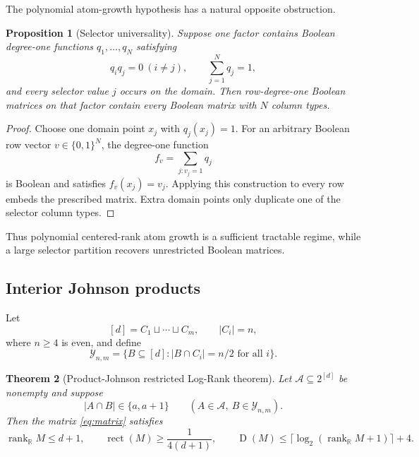 \documentclass[11pt]{article}
\newtheorem{theorem}{Theorem}[section]
\newtheorem{proposition}[theorem]{Proposition}
\theoremstyle{definition}
\theoremstyle{remark}
\newcommand{\cA}{\mathcal A}
\newcommand{\cY}{\mathcal Y}
\newcommand{\R}{\mathbb R}
\newcommand{\1}{\mathbf 1}
\newcommand{\rank}{\operatorname{rank}}
\newcommand{\rect}{\operatorname{rect}}
\newcommand{\Dcc}{\operatorname{D}}
\begin{document}
The polynomial atom-growth hypothesis has a natural opposite obstruction.

\begin{proposition}[Selector universality]\label{prop:selector}
Suppose one factor contains Boolean degree-one functions
$q_1,\ldots,q_N$ satisfying
\[
 q_iq_j=0\ (i\ne j),
 \qquad
 \sum_{j=1}^Nq_j=1,
\]
and every selector value $j$ occurs on the domain.  Then row-degree-one
Boolean matrices on that factor contain every Boolean matrix with $N$
column types.
\end{proposition}

\begin{proof}
Choose one domain point $x_j$ with $q_j(x_j)=1$.  For an arbitrary Boolean
row vector $v\in\{0,1\}^N$, the degree-one function
\[
 f_v=\sum_{j:v_j=1}q_j
\]
is Boolean and satisfies $f_v(x_j)=v_j$.  Applying this construction to every
row embeds the prescribed matrix.  Extra domain points only duplicate one of
the selector column types.
\end{proof}

Thus polynomial centered-rank atom growth is a sufficient tractable regime,
while a large selector partition recovers unrestricted Boolean matrices.

\subsection{Interior Johnson products}

Let
\[
 [d]=C_1\sqcup\cdots\sqcup C_m,
 \qquad |C_i|=n,
\]
where $n\ge4$ is even, and define
\begin{equation}\label{eq:product-family}
 \cY_{n,m}=\{B\subseteq[d]:|B\cap C_i|=n/2\text{ for all }i\}.
\end{equation}

\begin{theorem}[Product-Johnson restricted Log-Rank theorem]
\label{thm:product}
Let $\cA\subseteq2^{[d]}$ be nonempty and suppose
\[
 |A\cap B|\in\{a,a+1\}
 \qquad(A\in\cA,\ B\in\cY_{n,m}).
\]
Then the matrix \eqref{eq:matrix} satisfies
\[
 \rank_{\R}M\le d+1,
 \qquad
 \rect(M)\ge\frac1{4(d+1)},
 \qquad
 \Dcc(M)\le\lceil\log_2(\rank_{\R}M+1)\rceil+4.
\]
\end{theorem}
\end{document}
